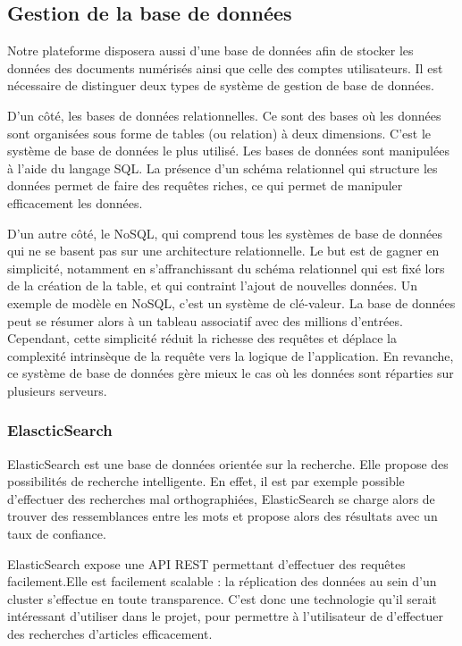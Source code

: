     \subsection{Gestion de la base de données}
    \label{subsec:bdd}

   Notre plateforme disposera aussi d’une base de données afin de stocker les données des documents numérisés
   ainsi que celle des comptes utilisateurs. Il est nécessaire de distinguer deux types de système de gestion de base de données.

    D’un côté, les bases de données relationnelles. Ce sont des bases où les données sont organisées
    sous forme de tables (ou relation) à deux dimensions. C’est le système de base de données le plus utilisé.
    Les bases de données sont manipulées à l’aide du langage SQL. La présence d’un schéma relationnel qui structure
    les données permet de faire des requêtes riches, ce qui permet de manipuler efficacement les données.

    D’un autre côté, le NoSQL, qui comprend tous les systèmes de base de données qui ne se basent pas sur une
    architecture relationnelle. Le but est de gagner en simplicité, notamment en s’affranchissant du schéma relationnel
    qui est fixé lors de la création de la table, et qui contraint l’ajout de nouvelles données. Un exemple de modèle en NoSQL,
    c’est un système de clé-valeur. La base de données peut se résumer alors à un tableau associatif avec des millions d’entrées.
    Cependant, cette simplicité réduit la richesse des requêtes et déplace la complexité intrinsèque de la requête vers
    la logique de l’application. En revanche, ce système de base de données gère mieux le cas où les données sont réparties
    sur plusieurs serveurs.

        \subsubsection{ElascticSearch}
        \label{subsubsec:elasticsearch}
        ElasticSearch est une base de données orientée sur la recherche.
        Elle propose des possibilités de recherche intelligente. En effet, il est par exemple possible
        d'effectuer des recherches mal orthographiées, ElasticSearch se charge alors de trouver des ressemblances
        entre les mots et propose alors des résultats avec un taux de confiance.

        ElasticSearch expose une API REST permettant d'effectuer des requêtes facilement.Elle est facilement scalable :
        la réplication des données au sein d'un cluster s'effectue en toute transparence.
        C'est donc une technologie qu'il serait intéressant d'utiliser dans le projet, pour permettre à l'utilisateur
        de d'effectuer des recherches d'articles efficacement.

